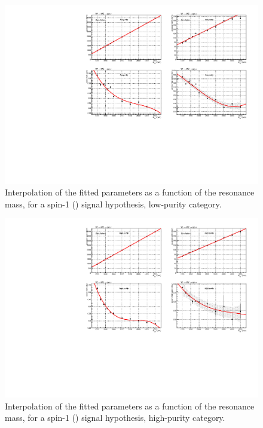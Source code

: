 \begin{figure}[!htb]
  \centering
    \includegraphics[width=.95\textwidth]{plotsAlpha_tesi/XVZnnlp/XWZInv_SignalShape.pdf}
  \caption{Interpolation of the fitted parameters as a function of the resonance mass, for a spin-1 (\Wp) signal hypothesis, low-purity category.}
  \label{fig:XWZ_SignalShapeLP}
\end{figure}

\begin{figure}[!htb]
  \centering
    \includegraphics[width=.95\textwidth]{plotsAlpha_tesi/XVZnnhp/XWZInv_SignalShape.pdf}

  \caption{Interpolation of the fitted parameters as a function of the resonance mass, for a spin-1 (\Wp) signal hypothesis, high-purity category.}
  \label{fig:XWZ_SignalShapeHP}
\end{figure}


